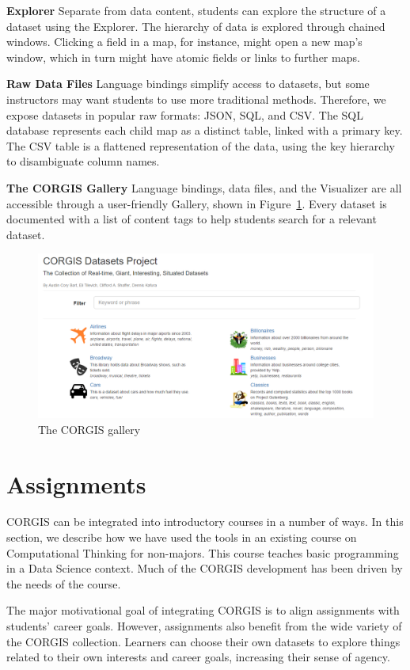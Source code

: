 \documentclass{sig-alternate}
\begin{document}
\textbf{Explorer} Separate from data content, students can explore the structure of a dataset using the Explorer.
The hierarchy of data is explored through chained windows.
Clicking a field in a map, for instance, might open a new map's window, which in turn might have atomic fields or links to further maps.


\textbf{Raw Data Files} Language bindings simplify access to datasets, but some instructors may want students to use more traditional methods.
Therefore, we expose datasets in popular raw formats: JSON, SQL, and CSV.
The SQL database represents each child map as a distinct table, linked with a primary key.
The CSV table is a flattened representation of the data, using the key hierarchy to disambiguate column names.

\textbf{The CORGIS Gallery} Language bindings, data files, and the Visualizer are all accessible through a user-friendly Gallery, shown in Figure~\ref{fig:corgis-gallery}.
Every dataset is documented with a list of content tags to help students search for a relevant dataset.

\begin{figure}[hb!]
    \centering
    \includegraphics[width=.47\textwidth]{graphics/gallery}
    \caption{The CORGIS gallery}
    \label{fig:corgis-gallery}
\end{figure}


\newpage
\section{Assignments}

CORGIS can be integrated into introductory courses in a number of ways.
In this section, we describe how we have used the tools in an existing course on Computational Thinking for non-majors.
This course teaches basic programming in a Data Science context.
Much of the CORGIS development has been driven by the needs of the course.

The major motivational goal of integrating CORGIS is to align assignments with students' career goals.
However, assignments also benefit from the wide variety of the CORGIS collection.
Learners can choose their own datasets to explore things related to their own interests and career goals, increasing their sense of agency.
\end{document}
